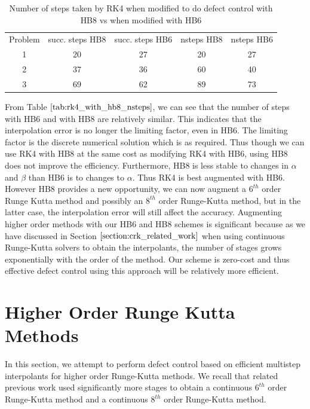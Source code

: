 \begin{table}[h]
\caption {Number of steps taken by RK4 when modified to do defect control with HB8 vs when modified with HB6} \label{tab:rk4_with_hb8_nsteps}
\begin{center}
\begin{tabular}{ c c c c c } 
Problem & succ. steps HB8 & succ. steps HB6 & nsteps HB8 & nsteps HB6 \\ 
1       & 20                 &        27          & 20         & 27\\ 
2       & 37                 &        36          & 60         & 40\\
3       & 69                 &        62          & 89         & 73\\
\end{tabular}
\end{center}
\end{table}

From Table $\ref{tab:rk4_with_hb8_nsteps}$, we can see that the number of steps with HB6 and with HB8 are relatively similar. This indicates that the interpolation error is no longer the limiting factor, even in HB6. The limiting factor is the discrete numerical solution which is as required. Thus though we can use RK4 with HB8 at the same cost as modifying RK4 with HB6, using HB8 does not improve the efficiency. Furthermore, HB8 is less stable to changes in $\alpha$ and $\beta$ than HB6 is to changes to $\alpha$. Thus RK4 is best augmented with HB6. However HB8 provides a new opportunity, we can now augment a $6^{th}$ order Runge Kutta method and possibly an $8^{th}$ order Runge-Kutta method, but in the latter case, the interpolation error will still affect the accuracy. Augmenting higher order methods with our HB6 and HB8 schemes is significant because as we have discussed in Section $\ref{section:crk_related_work}$ when using continuous Runge-Kutta solvers to obtain the interpolants, the number of stages grows exponentially with the order of the method. Our scheme is zero-cost and thus effective defect control using this approach will be relatively more efficient.


\section{Higher Order Runge Kutta Methods}
\label{section:HBs_and_higher_order_RK}
In this section, we attempt to perform defect control based on efficient multistep interpolants for higher order Runge-Kutta methods. We recall that related previous work used significantly more stages to obtain a continuous $6^{th}$ order Runge-Kutta method and a continuous $8^{th}$ order Runge-Kutta method.


